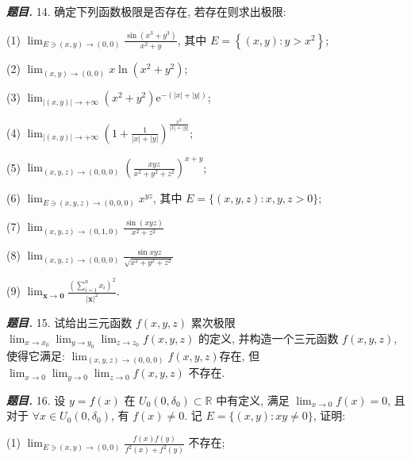 \documentclass[10pt, a4paper, oneside]{ctexart}
\newenvironment{problem}{\begin{framed}\par\noindent\textbf{\textit{题目. }}}{\end{framed}\par}
\begin{document}
\begin{problem}
14. 确定下列函数极限是否存在, 若存在则求出极限:

(1) $\lim _{E \ni(x, y) \rightarrow(0,0)} \frac{\sin \left(x^3+y^3\right)}{x^2+y}$, 其中 $E=\left\{(x, y): y>x^2\right\}$;

(2) $\lim _{(x, y) \rightarrow(0,0)} x \ln \left(x^2+y^2\right)$;

(3) $\lim _{|(x, y)| \rightarrow+\infty}\left(x^2+y^2\right) \mathrm{e}^{-(|x|+|y|)}$;

(4) $\lim _{|(x, y)| \rightarrow+\infty}\left(1+\frac{1}{|x|+|y|}\right)^{\frac{x^2}{|x|+|y|}}$;

(5) $\lim _{(x, y, z) \rightarrow(0,0,0)}\left(\frac{x y z}{x^2+y^2+z^2}\right)^{x+y}$;

(6) $\lim _{E \ni(x, y, z) \rightarrow(0,0,0)} x^{y z}$, 其中 $E=\{(x, y, z): x, y, z>0\}$;

(7) $\lim _{(x, y, z) \rightarrow(0,1,0)} \frac{\sin (x y z)}{x^2+z^2}$

(8) $\lim _{(x, y, z) \rightarrow(0,0,0)} \frac{\sin x y z}{\sqrt{x^2+y^2+z^2}}$

(9) $\lim _{\boldsymbol{x} \rightarrow \mathbf{0}} \frac{\left(\sum_{i=1}^n x_i\right)^2}{|\boldsymbol{x}|^2}$.
\end{problem}

\begin{problem}
15. 试给出三元函数 $f(x, y, z)$ 累次极限 $\lim _{x \rightarrow x_0} \lim _{y \rightarrow y_0} \lim _{z \rightarrow z_0} f(x, y, z)$ 的定义, 并构造一个三元函数 $f(x, y, z)$, 使得它满足: $\lim _{(x, y, z) \rightarrow(0,0,0)} f(x, y, z)$存在, 但 $\lim _{x \rightarrow 0} \lim _{y \rightarrow 0} \lim _{z \rightarrow 0} f(x, y, z)$ 不存在.
\end{problem}

\begin{problem}
16. 设 $y=f(x)$ 在 $U_0\left(0, \delta_0\right) \subset \mathbb{R}$ 中有定义, 满足 $\lim _{x \rightarrow 0} f(x)=0$, 且对于 $\forall x \in U_0\left(0, \delta_0\right)$, 有 $f(x) \neq 0$. 记 $E=\{(x, y): x y \neq 0\}$, 证明:

(1) $\lim _{E \ni(x, y) \rightarrow(0,0)} \frac{f(x) f(y)}{f^2(x)+f^2(y)}$ 不存在;
\end{problem}
\end{document}
